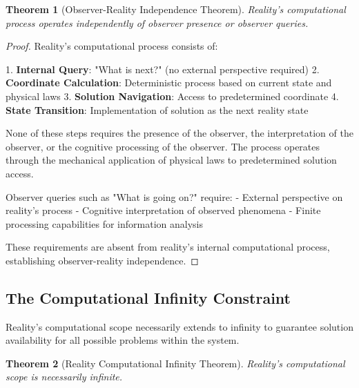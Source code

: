 \documentclass[12pt,a4paper]{article}
\newtheorem{theorem}{Theorem}[section]
\begin{document}
\begin{theorem}[Observer-Reality Independence Theorem]
Reality's computational process operates independently of observer presence or observer queries.
\end{theorem}

\begin{proof}
Reality's computational process consists of:

1. \textbf{Internal Query}: "What is next?" (no external perspective required)
2. \textbf{Coordinate Calculation}: Deterministic process based on current state and physical laws
3. \textbf{Solution Navigation}: Access to predetermined coordinate
4. \textbf{State Transition}: Implementation of solution as the next reality state

None of these steps requires the presence of the observer, the interpretation of the observer, or the cognitive processing of the observer. The process operates through the mechanical application of physical laws to predetermined solution access.

Observer queries such as "What is going on?" require:
- External perspective on reality's process
- Cognitive interpretation of observed phenomena  
- Finite processing capabilities for information analysis

These requirements are absent from reality's internal computational process, establishing observer-reality independence.
\end{proof}

\subsection{The Computational Infinity Constraint}

Reality's computational scope necessarily extends to infinity to guarantee solution availability for all possible problems within the system.

\begin{theorem}[Reality Computational Infinity Theorem]
Reality's computational scope is necessarily infinite.
\end{theorem}
\end{document}
